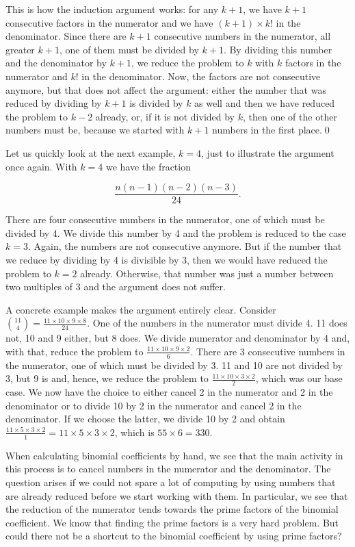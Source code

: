 \documentclass[tikz]{scrreprt}
\begin{document}
This is how the induction argument works:
for any $k+1$, we have $k+1$ consecutive
factors in the numerator and we have
$(k+1)\times k!$ in the 
denominator. Since there are $k+1$ consecutive numbers
in the numerator, all greater $k+1$, 
one of them must be divided by $k+1$.
By dividing this number and the denominator by $k+1$,
we reduce the problem to $k$ with $k$ factors
in the numerator and $k!$ in the denominator.
Now, the factors are not consecutive anymore,
but that does not affect the argument:
either the number that was reduced by dividing
by $k+1$ is divided by $k$ as well
and then we have reduced the problem to $k-2$ already,
or, if it is not divided by $k$, then 
one of the other numbers must be,
because we started with $k+1$ numbers in the first place.\qed

Let us quickly look at the next example, $k=4$,
just to illustrate the argument once again.
With $k=4$ we have the fraction

\[
\frac{n(n-1)(n-2)(n-3)}{24}.
\]

There are four consecutive numbers in the numerator,
one of which must be divided by 4. We divide this number
by 4 and the problem is reduced to the case $k=3$.
Again, the numbers are not consecutive anymore.
But if the number that we reduce by dividing by 4
is divisible by 3, then we would have reduced
the problem to $k=2$ already. Otherwise, that
number was just a number between two multiples of
3 and the argument does not suffer.

A concrete example makes the argument entirely clear.
Consider $\binom{11}{4} = \frac{11\times 10 \times 9 \times 8}{24}$.
One of the numbers in the numerator must divide 4.
11 does not, 10 and 9 either, but 8 does.
We divide numerator and denominator by 4 and,
with that, reduce the problem to 
$\frac{11\times 10 \times 9 \times 2}{6}$.
There are 3 consecutive numbers in the numerator,
one of which must be divided by 3.
11 and 10 are not divided by 3,
but 9 is and, hence, we reduce the problem to
$\frac{11\times 10 \times 3 \times 2}{2}$,
which was our base case. 
We now have the choice to either cancel 2
in the numerator and 2 in the denominator
or to divide 10 by 2 in the numerator and
cancel 2 in the denominator.
If we choose the latter,
we divide 10 by 2 and obtain
$\frac{11\times 5 \times 3 \times 2}{1} = 11 \times 5 \times 3 \times 2$,
which is $55 \times 6 = 330$.

When calculating binomial coefficients by hand,
we see that the main activity in this process
is to cancel numbers in the numerator and the
denominator.
The question arises if we could not spare
a lot of computing by using numbers
that are already reduced before we start working with them.
In particular, we see that the reduction
of the numerator tends towards the prime
factors of the binomial coefficient.
We know that finding the prime factors
is a very hard problem.
But could there not be a 
shortcut to the binomial coefficient
by using prime factors?
\end{document}
